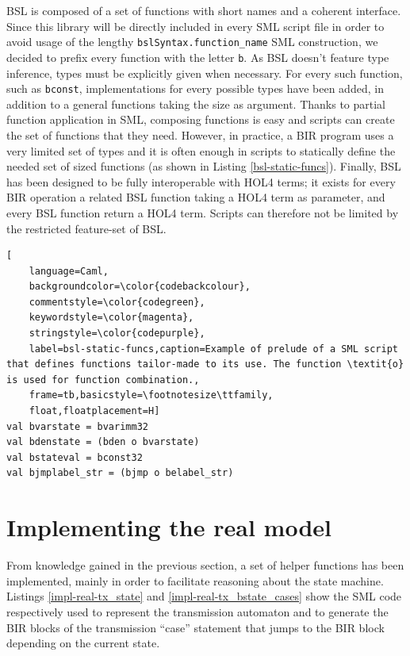 \documentclass{kththesis}
\begin{document}
BSL is composed of a set of functions with short names and a coherent interface. Since this library will be directly included in every \gls{SML} script file in order to avoid usage of the lengthy \texttt{bslSyntax.function\_name} SML construction, we decided to prefix every function with the letter \texttt{b}. As BSL doesn't feature type inference, types must be explicitly given when necessary. For every such function, such as \texttt{bconst}, implementations for every possible types have been added, in addition to a general functions taking the size as argument. Thanks to partial function application in SML, composing functions is easy and scripts can create the set of functions that they need. However, in practice, a BIR program uses a very limited set of types and it is often enough in scripts to statically define the needed set of sized functions (as shown in Listing \ref{bsl-static-funcs}). Finally, BSL has been designed to be fully interoperable with HOL4 terms; it exists for every BIR operation a related BSL function taking a HOL4 term as parameter, and every BSL function return a HOL4 term. Scripts can therefore not be limited by the restricted feature-set of BSL.

\begin{lstlisting}[
    language=Caml,
    backgroundcolor=\color{codebackcolour},
    commentstyle=\color{codegreen},
    keywordstyle=\color{magenta},
    stringstyle=\color{codepurple},
    label=bsl-static-funcs,caption=Example of prelude of a SML script that defines functions tailor-made to its use. The function \textit{o} is used for function combination.,
    frame=tb,basicstyle=\footnotesize\ttfamily,
    float,floatplacement=H]
val bvarstate = bvarimm32
val bdenstate = (bden o bvarstate)
val bstateval = bconst32
val bjmplabel_str = (bjmp o belabel_str)
\end{lstlisting}


\section{Implementing the real model} \label{impl-real-model}

From knowledge gained in the previous section, a set of helper functions has been implemented, mainly in order to facilitate reasoning about the state machine. Listings \ref{impl-real-tx_state} and \ref{impl-real-tx_bstate_cases} show the SML code respectively used to represent the transmission automaton and to generate the BIR blocks of the transmission ``case'' statement that jumps to the BIR block depending on the current state.
\end{document}
